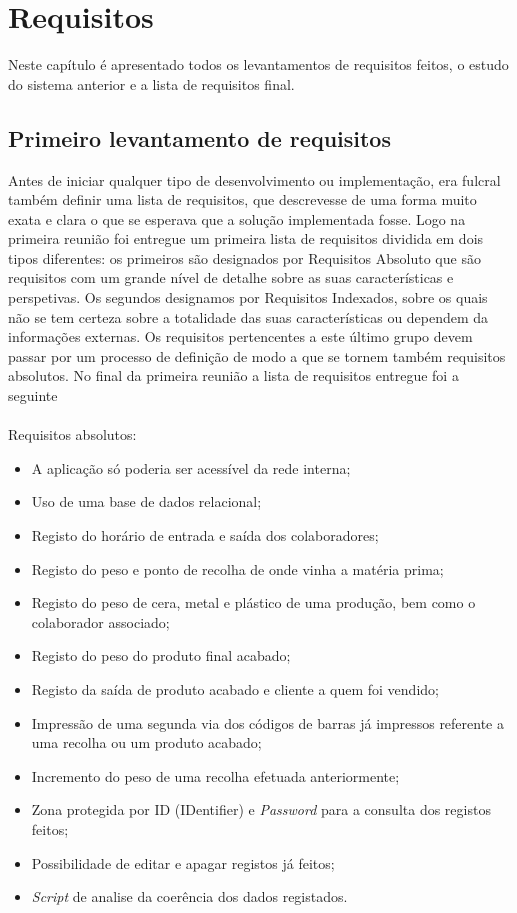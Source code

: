 \chapter{Requisitos} 
\label{cap:3}
Neste capítulo é apresentado todos os levantamentos de requisitos feitos, o estudo do sistema anterior e a lista de requisitos final.

\section{Primeiro levantamento de requisitos}
Antes de iniciar qualquer tipo de desenvolvimento ou implementação, era fulcral também definir uma lista de requisitos, que descrevesse de uma forma muito exata e clara o que se esperava que a solução implementada fosse. Logo na primeira reunião foi entregue um primeira lista de requisitos dividida em dois tipos diferentes: os primeiros são designados por Requisitos Absoluto que são requisitos com um grande nível de detalhe sobre as suas características e perspetivas. Os segundos designamos por Requisitos Indexados, sobre os quais não se tem certeza sobre a totalidade das suas características ou dependem da informações externas. Os requisitos pertencentes a este último grupo devem passar por um processo de definição de modo a que se tornem também requisitos absolutos.
No final da primeira reunião a lista de requisitos entregue foi a seguinte\\
\\
Requisitos absolutos:
\begin{itemize}
	\item A aplicação só poderia ser acessível da rede interna;
	\item Uso de uma base de dados relacional;
	\item Registo do horário de entrada e saída dos colaboradores;
	\item Registo do peso e ponto de recolha de onde vinha a matéria prima;
	\item Registo do peso de cera, metal e plástico de uma produção, bem como o colaborador associado;
	\item Registo do peso do produto final acabado;
	\item Registo da saída de produto acabado e cliente a quem foi vendido;
	\item Impressão de uma segunda via dos códigos de barras já impressos referente a uma recolha ou um produto acabado;
	\item Incremento do peso de uma recolha efetuada anteriormente;
	\item Zona protegida por ID (IDentifier) e \textit{Password} para a consulta dos registos feitos;
	\item Possibilidade de editar e apagar registos já feitos;
	\item \textit{Script} de analise da coerência dos dados registados.
\end{itemize}
